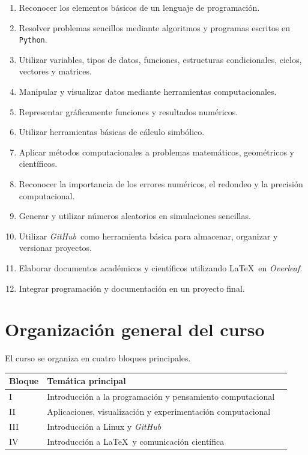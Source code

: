 \documentclass[12pt,letterpaper]{article}
\newcommand{\python}{\texttt{Python}}
\newcommand{\latexname}{\LaTeX}
\newcommand{\github}{\textit{GitHub}}
\newcommand{\overleaf}{\textit{Overleaf}}
\begin{document}
\begin{enumerate}[noitemsep]
    \item Reconocer los elementos básicos de un lenguaje de programación.
    
    \item Resolver problemas sencillos mediante algoritmos y programas
    escritos en \python.
    
    \item Utilizar variables, tipos de datos, funciones, estructuras
    condicionales, ciclos, vectores y matrices.
    
    \item Manipular y visualizar datos mediante herramientas
    computacionales.
    
    \item Representar gráficamente funciones y resultados numéricos.
    
    \item Utilizar herramientas básicas de cálculo simbólico.
    
    \item Aplicar métodos computacionales a problemas matemáticos,
    geométricos y científicos.
    
    \item Reconocer la importancia de los errores numéricos, el redondeo
    y la precisión computacional.
    
    \item Generar y utilizar números aleatorios en simulaciones sencillas.
    
    \item Utilizar \github\ como herramienta básica para almacenar,
    organizar y versionar proyectos.
    
    \item Elaborar documentos académicos y científicos utilizando
    \latexname\ en \overleaf.
    
    \item Integrar programación y documentación en un proyecto final.
\end{enumerate}

\section{Organización general del curso}

El curso se organiza en cuatro bloques principales.
\begin{tabular}{lll}
\toprule
\textbf{Bloque} & \textbf{Temática principal} & \\
\midrule
I & Introducción a la programación y pensamiento computacional &  \\
II & Aplicaciones, visualización y experimentación computacional & \\
III & Introducción a Linux y \github &  \\
IV & Introducción a \latexname\ y comunicación científica & \\
\bottomrule
\end{tabular}
\end{document}
